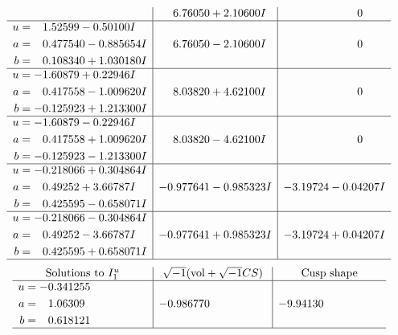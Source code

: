 \documentclass[1p]{elsarticle_modified}
\theoremstyle{definition}
\newcommand{\I}{\sqrt{-1}}
\begin{document}
$$\begin{array}{c|c|c}
 & \phantom{-}6.76050 + 2.10600 I & \phantom{-0.000000 } 0 \\ \hline\begin{aligned}
u &= \phantom{-}1.52599 - 0.50100 I \\
a &= \phantom{-}0.477540 - 0.885654 I \\
b &= \phantom{-}0.108340 + 1.030180 I\end{aligned}
 & \phantom{-}6.76050 - 2.10600 I & \phantom{-0.000000 } 0 \\ \hline\begin{aligned}
u &= -1.60879 + 0.22946 I \\
a &= \phantom{-}0.417558 - 1.009620 I \\
b &= -0.125923 + 1.213300 I\end{aligned}
 & \phantom{-}8.03820 + 4.62100 I & \phantom{-0.000000 } 0 \\ \hline\begin{aligned}
u &= -1.60879 - 0.22946 I \\
a &= \phantom{-}0.417558 + 1.009620 I \\
b &= -0.125923 - 1.213300 I\end{aligned}
 & \phantom{-}8.03820 - 4.62100 I & \phantom{-0.000000 } 0 \\ \hline\begin{aligned}
u &= -0.218066 + 0.304864 I \\
a &= \phantom{-}0.49252 + 3.66787 I \\
b &= \phantom{-}0.425595 - 0.658071 I\end{aligned}
 & -0.977641 - 0.985323 I & -3.19724 - 0.04207 I \\ \hline\begin{aligned}
u &= -0.218066 - 0.304864 I \\
a &= \phantom{-}0.49252 - 3.66787 I \\
b &= \phantom{-}0.425595 + 0.658071 I\end{aligned}
 & -0.977641 + 0.985323 I & -3.19724 + 0.04207 I\\
 \hline 
 \end{array}$$\newpage$$\begin{array}{c|c|c}  
\text{Solutions to }I^u_{1}& \I (\text{vol} + \sqrt{-1}CS) & \text{Cusp shape}\\
 \hline 
\begin{aligned}
u &= -0.341255\phantom{ +0.000000I} \\
a &= \phantom{-}1.06309\phantom{ +0.000000I} \\
b &= \phantom{-}0.618121\phantom{ +0.000000I}\end{aligned}
 & -0.986770\phantom{ +0.000000I} & -9.94130\phantom{ +0.000000I}\\
 \hline 
 \end{array}$$\newpage\newpage\renewcommand{\arraystretch}{1}
\end{document}
